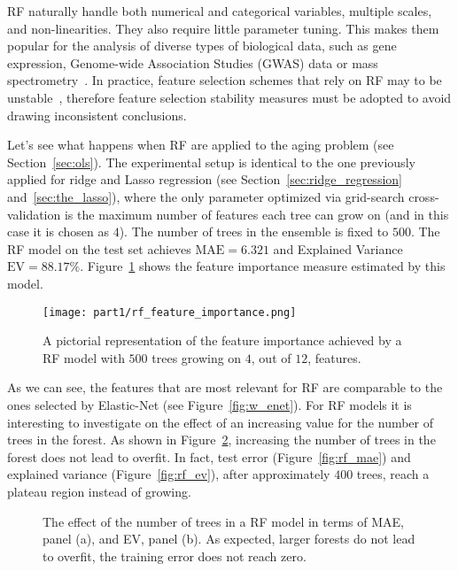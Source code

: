 	    RF naturally handle both numerical and categorical variables, multiple scales, and non-linearities. They also require little parameter tuning. This makes them popular for the analysis of diverse types of biological data, such as gene expression, Genome-wide Association Studies (\ac{GWAS}) data or mass spectrometry~\cite{qi2012random}.
		In practice, feature selection schemes that rely on RF may to be unstable~\cite{kursa2014robustness}, therefore feature selection stability measures must be adopted to avoid drawing inconsistent conclusions.
		
		Let's see what happens when RF are applied to the aging problem (see Section~\ref{sec:ols}). The experimental setup is identical to the one previously applied for ridge and Lasso regression (see Section~\ref{sec:ridge_regression} and~\ref{sec:the_lasso}), where the only parameter optimized via grid-search cross-validation is the maximum number of features each tree can grow on (and in this case it is chosen as $4$). The number of trees in the ensemble is fixed to $500$. The RF model on the test set achieves $\text{MAE} = 6.321$ and Explained Variance $\text{EV} = 88.17\%$.
		Figure~\ref{fig:rf_feature_importance} shows the feature importance measure estimated by this model.
		\begin{figure}[!h]
			\centering
			\texttt{[image: part1/rf\_feature\_importance.png]}
			\caption{A pictorial representation of the feature importance achieved by a RF model with $500$ trees growing on $4$, out of $12$, features.} \label{fig:rf_feature_importance}
		\end{figure}
		As we can see, the features that are most relevant for RF are comparable to the ones selected by Elastic-Net (see Figure~\ref{fig:w_enet}).
		For RF models it is interesting to investigate on the effect of an increasing value for the number of trees in the forest. As shown in Figure~\ref{fig:rf_increasing}, increasing the number of trees in the forest does not lead to overfit. In fact, test error (Figure~\ref{fig:rf_mae}) and explained variance (Figure~\ref{fig:rf_ev}), after approximately $400$ trees, reach a plateau region instead of growing.
	    \begin{figure}[!h]
			\centering
			\caption{The effect of the number of trees in a RF model in terms of MAE, panel (a), and EV, panel (b). As expected, larger forests do not lead to overfit, \ie the training error does not reach zero.}\label{fig:rf_increasing}
		\end{figure}

